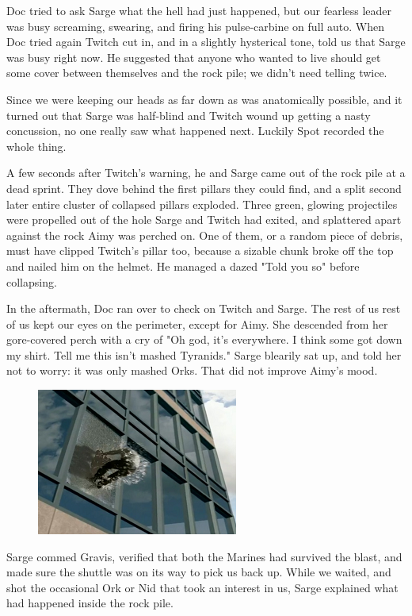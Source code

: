Doc tried to ask Sarge what the hell had just happened, but our fearless leader was busy screaming, swearing, and firing his pulse-carbine on full auto. 
When Doc tried again Twitch cut in, and in a slightly hysterical tone, told us that Sarge was busy right now. 
He suggested that anyone who wanted to live should get some cover between themselves and the rock pile; 
we didn't need telling twice.

Since we were keeping our heads as far down as was anatomically possible, and it turned out that Sarge was half-blind and Twitch wound up getting a nasty concussion, no one really saw what happened next. 
Luckily Spot recorded the whole thing.

A few seconds after Twitch's warning, he and Sarge came out of the rock pile at a dead sprint. 
They dove behind the first pillars they could find, and a split second later entire cluster of collapsed pillars exploded. 
Three green, glowing projectiles were propelled out of the hole Sarge and Twitch had exited, and splattered apart against the rock Aimy was perched on. 
One of them, or a random piece of debris, must have clipped Twitch's pillar too, because a sizable chunk broke off the top and nailed him on the helmet. 
He managed a dazed "Told you so" before collapsing.

In the aftermath, Doc ran over to check on Twitch and Sarge. 
The rest of us rest of us kept our eyes on the perimeter, except for Aimy. 
She descended from her gore-covered perch with a cry of "Oh god, it's everywhere. 
I think some got down my shirt. 
Tell me this isn't mashed Tyranids." Sarge blearily sat up, and told her not to worry: 
it was only mashed Orks. 
That did not improve Aimy's mood.

\begin{figure}
	\begin{center}
		\includegraphics[width=\figwidth]{pics/12/39.png}
	\end{center}
\end{figure}
Sarge commed Gravis, verified that both the Marines had survived the blast, and made sure the shuttle was on its way to pick us back up. 
While we waited, and shot the occasional Ork or Nid that took an interest in us, Sarge explained what had happened inside the rock pile. 


